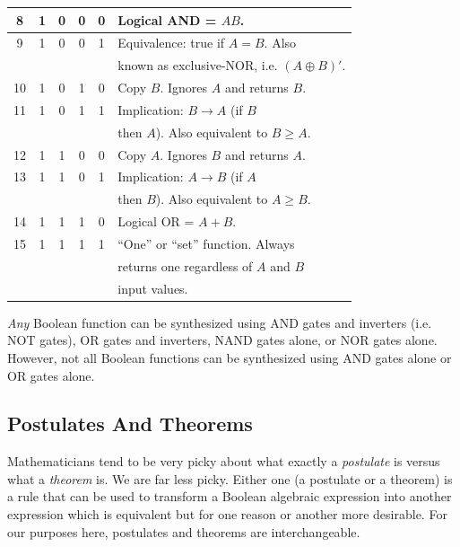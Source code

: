 \begin{table}
\begin{center}
\begin{tabular}{|c||c|c|c|c||l|}
\hline
 8 & 1 & 0 & 0 & 0 & \small{Logical AND = $AB$.                     }       \\
\hline
 9 & 1 & 0 & 0 & 1 & \small{Equivalence:  true if $A=B$.  Also}       \\
   &   &   &   &   & \small{known as exclusive-NOR, i.e. $(A \oplus B)'$.}       \\
\hline
10 & 1 & 0 & 1 & 0 & \small{Copy $B$.  Ignores $A$ and returns $B$. }       \\
\hline
11 & 1 & 0 & 1 & 1 & \small{Implication:  $B \rightarrow A$ (if $B$ }       \\
   &   &   &   &   & \small{then $A$).  Also equivalent to $B \geq A$.}     \\
\hline
12 & 1 & 1 & 0 & 0 & \small{Copy $A$.  Ignores $B$ and returns $A$. }       \\
\hline
13 & 1 & 1 & 0 & 1 & \small{Implication:  $A \rightarrow B$ (if $A$ }       \\
   &   &   &   &   & \small{then $B$).  Also equivalent to $A \geq B$.}     \\
\hline
14 & 1 & 1 & 1 & 0 & \small{Logical OR = $A+B$.                     }       \\
\hline
15 & 1 & 1 & 1 & 1 & \small{``One'' or ``set'' function.  Always    }       \\
   &   &   &   &   & \small{returns one regardless of $A$ and $B$   }       \\
   &   &   &   &   & \small{input values.                           }       \\
\hline
\end{tabular}
\end{center}
\end{table}

\emph{Any} Boolean function can be synthesized using AND gates and inverters
(i.e. NOT gates), OR gates and inverters, NAND gates alone, or NOR 
gates alone.  However, not all Boolean functions can be synthesized
using AND gates alone or OR gates alone.


\subsection{Postulates And Theorems}
\label{cbal0:ssam0:spos0}

Mathematicians tend to be very picky about what exactly a
\emph{postulate} is versus what a \emph{theorem} is.  We are
far less picky.  Either one (a postulate or a theorem) is a
rule that can be used to transform a Boolean algebraic expression
into another expression which is equivalent but for one reason or another
more desirable.  For our purposes here, postulates and theorems
are interchangeable.

